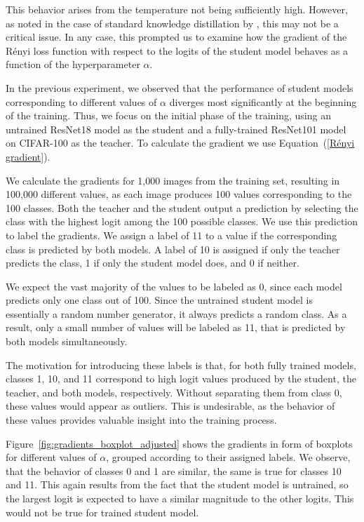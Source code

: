 This behavior arises from the temperature not being sufficiently high. However, as noted in the case of standard knowledge distillation by \cite{HintonVinyalsDean2015}, this may not be a critical issue. In any case, this prompted us to examine how the gradient of the Rényi loss function with respect to the logits of the student model behaves as a function of the hyperparameter $\alpha$.

In the previous experiment, we observed that the performance of student models corresponding to different values of $\alpha$ diverges most significantly at the beginning of the training. Thus, we focus on the initial phase of the training, using an untrained ResNet18 model as the student and a fully-trained ResNet101 model on CIFAR-100 as the teacher. To calculate the gradient we use Equation~(\ref{Rényi gradient}).

We calculate the gradients for 1,000 images from the training set, resulting in 100,000 different values, as each image produces 100 values corresponding to the 100 classes. Both the teacher and the student output a prediction by selecting the class with the highest logit among the 100 possible classes. We use this prediction to label the gradients. We assign a label of 11 to a value if the corresponding class is predicted by both models. A label of 10 is assigned if only the teacher predicts the class, 1 if only the student model does, and 0 if neither.

We expect the vast majority of the values to be labeled as 0, since each model predicts only one class out of 100. Since the untrained student model is essentially a random number generator, it always predicts a random class. As a result, only a small number of values will be labeled as 11, that is predicted by both models simultaneously.

The motivation for introducing these labels is that, for both fully trained models, classes 1, 10, and 11 correspond to high logit values produced by the student, the teacher, and both models, respectively. Without separating them from class 0, these values would appear as outliers. This is undesirable, as the behavior of these values provides valuable insight into the training process.

Figure~\ref{fig:gradients_boxplot_adjusted} shows the gradients in form of boxplots for different values of $\alpha$, grouped according to their assigned labels. We observe, that the behavior of classes 0 and 1 are similar, the same is true for classes 10 and 11. This again results from the fact that the student model is untrained, so the largest logit is expected to have a similar magnitude to the other logits. This would not be true for trained student model.

